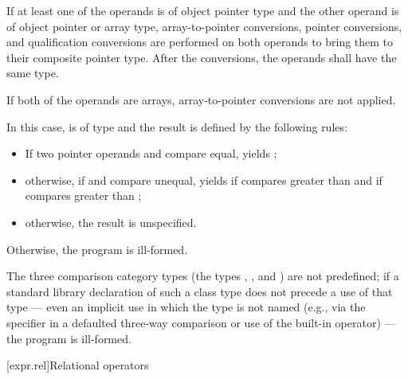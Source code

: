 \pnum
If at least one of the operands is of object pointer type and
the other operand is of object pointer or array type,
array-to-pointer conversions,
pointer conversions,
and
qualification conversions
are performed on both operands
to bring them to their composite pointer type.
After the conversions, the operands shall have the same type.
\begin{note}
If both of the operands are arrays,
array-to-pointer conversions are not applied.
\end{note}
In this case,
 is of type  and
the result is defined by the following rules:
\begin{itemize}
\item
If two pointer operands  and  compare equal,
 yields ;
\item
otherwise, if  and  compare unequal,
 yields
if  compares greater than 
and
if  compares greater than ;
\item
otherwise, the result is unspecified.
\end{itemize}

\pnum
Otherwise, the program is ill-formed.

\pnum
The three comparison category types
(the types
,
, and
)
are not predefined;
if a standard library declaration
of such a class type does not precede
a use of that type ---
even an implicit use in which the type is not named
(e.g., via the  specifier
in a defaulted three-way comparison
or use of the built-in operator) --- the program is ill-formed.

[expr.rel]{Relational operators}%
%

